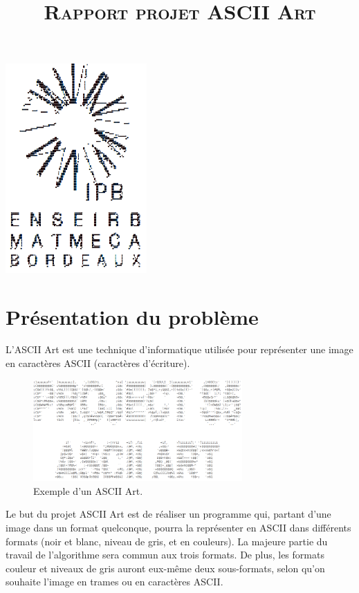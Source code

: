 \documentclass{article}
\title{\textsc{Rapport projet ASCII Art}}
\date{}
\begin{document}
\maketitle
\begin{center}
\includegraphics[height=8cm]{enseirblogo.png}
\end{center}

\section{Présentation du problème}
L'ASCII Art est une technique d'informatique utilisée pour représenter une image en caractères ASCII (caractères d'écriture).
\newline
\begin{figure}[h]
\centering
\includegraphics[width=8cm]{ascii_art_s5.png}
\caption{Exemple d'un ASCII Art.}
\end{figure}

Le but du projet ASCII Art est de réaliser un programme qui, partant d'une image dans un format quelconque, pourra la représenter en ASCII dans différents formats (noir et blanc, niveau de gris, et en couleurs). La majeure partie du travail de l'algorithme sera commun aux trois formats. De plus, les formats couleur et niveaux de gris auront eux-même deux sous-formats, selon qu'on souhaite l'image en trames ou en caractères ASCII.
\newline
\end{document}
